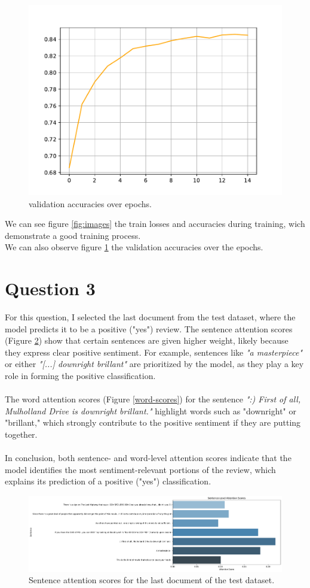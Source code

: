 \documentclass[a4paper]{article}
\begin{document}
\begin{figure}[H]
    \centering
    \includegraphics[width=.5\linewidth]{../figures/val_accs.pdf}
    \caption{validation accuracies over epochs.}
    \label{fig:third_image}
\end{figure}
We can see figure \ref{fig:images} the train losses and accuracies during training, wich demonstrate a good
training process.
\\
We can also observe figure \ref{fig:third_image} the validation accuracies over the epochs.



\section{Question 3}
\noindent
For this question, I selected the last document from the test dataset, where the model predicts
it to be a positive ("yes") review. The sentence attention scores (Figure \ref{sentence-scores})
show that certain sentences are given higher weight, likely because they express clear positive
sentiment. For example, sentences like \textit{"a masterpiece"} or either \textit{"[...] downright brillant"}
are prioritized by the model, as they play a key role in forming the positive classification.
\\
\\
\noindent
The word attention scores (Figure \ref{word-scores}) for the sentence \textit{":) First of all, Mulholland Drive 
is downright brillant."} highlight words such
as "downright" or "brillant," which strongly contribute to the positive sentiment if they are putting together.
\\
\\
\noindent
In conclusion, both sentence- and word-level attention scores indicate that the model identifies
the most sentiment-relevant portions of the review, which explains its prediction of a
positive ("yes") classification.


\begin{figure}[H]
    \centering
    \includegraphics[width=.9\linewidth]{../figures/Sentence_attention_scores.pdf}
    \caption{Sentence attention scores for the last document of the test dataset.}
    \label{sentence-scores}    
\end{figure}
\end{document}
